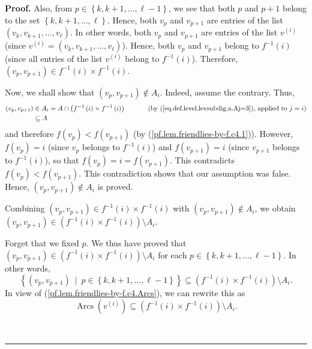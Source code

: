 \documentclass[numbers=enddot,12pt,final,onecolumn,notitlepage]{scrartcl}%
\numberwithin{exer}{section}
\theoremstyle{definition}
\newenvironment{proof}[1][Proof]{\noindent\textbf{#1.} }{\ \rule{0.5em}{0.5em}}
\newenvironment{verlong}{}{}
\begin{document}
\begin{verlong}
\begin{proof}
Also, from $p\in\left\{  k,k+1,\ldots,\ell-1\right\}  $, we see that both $p$
and $p+1$ belong to the set $\left\{  k,k+1,\ldots,\ell\right\}  $. Hence,
both $v_{p}$ and $v_{p+1}$ are entries of the list $\left(  v_{k}%
,v_{k+1},\ldots,v_{\ell}\right)  $. In other words, both $v_{p}$ and $v_{p+1}$
are entries of the list $v^{\left(  i\right)  }$ (since $v^{\left(  i\right)
}=\left(  v_{k},v_{k+1},\ldots,v_{\ell}\right)  $). Hence, both $v_{p}$ and
$v_{p+1}$ belong to $f^{-1}\left(  i\right)  $ (since all entries of the list
$v^{\left(  i\right)  }$ belong to $f^{-1}\left(  i\right)  $). Therefore,
$\left(  v_{p},v_{p+1}\right)  \in f^{-1}\left(  i\right)  \times
f^{-1}\left(  i\right)  $.

Now, we shall show that $\left(  v_{p},v_{p+1}\right)  \notin A_{i}$. Indeed,
assume the contrary. Thus,
\begin{align*}
\left(  v_{p},v_{p+1}\right)   &  \in A_{i}=A\cap\left(  f^{-1}\left(
i\right)  \times f^{-1}\left(  i\right)  \right)  \ \ \ \ \ \ \ \ \ \ \left(
\text{by (\ref{eq.def.level.levsubdig.a.Aj=3}), applied to }j=i\right) \\
&  \subseteq A
\end{align*}
and therefore $f\left(  v_{p}\right)  <f\left(  v_{p+1}\right)  $ (by
(\ref{pf.lem.friendlies-by-f.c4.1})). However, $f\left(  v_{p}\right)  =i$
(since $v_{p}$ belongs to $f^{-1}\left(  i\right)  $) and $f\left(
v_{p+1}\right)  =i$ (since $v_{p+1}$ belongs to $f^{-1}\left(  i\right)  $),
so that $f\left(  v_{p}\right)  =i=f\left(  v_{p+1}\right)  $. This
contradicts $f\left(  v_{p}\right)  <f\left(  v_{p+1}\right)  $. This
contradiction shows that our assumption was false. Hence, $\left(
v_{p},v_{p+1}\right)  \notin A_{i}$ is proved.

Combining $\left(  v_{p},v_{p+1}\right)  \in f^{-1}\left(  i\right)  \times
f^{-1}\left(  i\right)  $ with $\left(  v_{p},v_{p+1}\right)  \notin A_{i}$,
we obtain $\left(  v_{p},v_{p+1}\right)  \in\left(  f^{-1}\left(  i\right)
\times f^{-1}\left(  i\right)  \right)  \setminus A_{i}$.

Forget that we fixed $p$. We thus have proved that $\left(  v_{p}%
,v_{p+1}\right)  \in\left(  f^{-1}\left(  i\right)  \times f^{-1}\left(
i\right)  \right)  \setminus A_{i}$ for each $p\in\left\{  k,k+1,\ldots
,\ell-1\right\}  $. In other words,%
\[
\left\{  \left(  v_{p},v_{p+1}\right)  \ \mid\ p\in\left\{  k,k+1,\ldots
,\ell-1\right\}  \right\}  \subseteq\left(  f^{-1}\left(  i\right)  \times
f^{-1}\left(  i\right)  \right)  \setminus A_{i}.
\]
In view of (\ref{pf.lem.friendlies-by-f.c4.Arcs}), we can rewrite this as
\[
\operatorname*{Arcs}\left(  v^{\left(  i\right)  }\right)  \subseteq\left(
f^{-1}\left(  i\right)  \times f^{-1}\left(  i\right)  \right)  \setminus
A_{i}.
\]



\end{proof}
\end{verlong}
\end{document}
